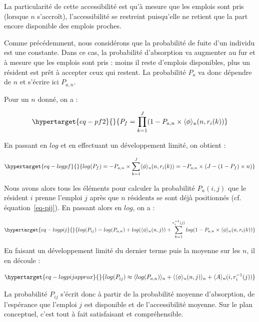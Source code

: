 \documentclass[
  10pt,
  a4paper,
  numbers=noendperiod,
  DIV=9]{scrreprt}
\begin{document}
La particularité de cette accessibilité est qu'à mesure que les emplois
sont pris (lorsque \(n\) s'accroît), l'accessibilité se restreint
puisqu'elle ne retient que la part encore disponible des emplois
proches.

Comme précédemment, nous considérons que la probabilité de fuite d'un
individu est une constante. Dans ce cas, la probabilité d'absorption va
augmenter au fur et à mesure que les emplois sont pris : moins il reste
d'emplois disponibles, plus un résident est prêt à accepter ceux qui
restent. La probabilité \(P_a\) va donc dépendre de \(n\) et s'écrire
ici \(P_{a,n}\).

Pour un \(n\) donné, on a :

\begin{equation}\protect\hypertarget{eq-pf2}{}{
P_f=\prod_{k=1}^J(1-P_{a,n}\times \langle \phi \rangle_u(n, r_i(k))
}\label{eq-pf2}\end{equation}

En passant en \(log\) et en effectuant un développement limité, on
obtient :

\begin{equation}\protect\hypertarget{eq-logpf}{}{
log(P_f)=-P_{a,n}\times\sum_{k=1}^J \langle \phi \rangle_u(n,r_i(k))=-P_{a,n}\times(J-(1-P_f)\times n)
}\label{eq-logpf}\end{equation}

Nous avons alors tous les éléments pour calculer la probabilité
\(P_n(i,j)\) que le résident \(i\) prenne l'emploi \(j\) après que \(n\)
résidents se sont déjà positionnés (cf. équation~\ref{eq-pij}). En
passant alors en \(log\), on a :

\begin{equation}\protect\hypertarget{eq-logpij}{}{
log(P_{ij})=log(P_{a,n})+log(\langle\phi \rangle_u(n,j))+\sum_{k=1}^{r_i^{-1}(j)}log(1-P_{a,n}\times \langle \phi \rangle_u(n,r_i(k))
}\label{eq-logpij}\end{equation}

En faisant un développement limité du dernier terme puis la moyenne sur
les \(n\), il en découle :

\begin{equation}\protect\hypertarget{eq-logpijapprox}{}{
log(P_{ij})\approx\langle log(P_{a,n})\rangle _n+\langle\langle\phi\rangle_u(n,j)\rangle_n + \langle A\rangle_n(i, r_i^{-1}(j))
}\label{eq-logpijapprox}\end{equation}

La probabilité \(P_{ij}\) s'écrit donc à partir de la probabilité
moyenne d'absorption, de l'espérance que l'emploi \(j\) est disponible
et de l'accessibilité moyenne. Sur le plan conceptuel, c'est tout à fait
satisfaisant et compréhensible.
\end{document}
